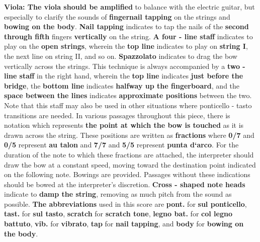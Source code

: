 \documentclass[12pt]{article}
\newcommand*\circled[1]{\tikz[baseline=(char.base)]{
            \node[shape=circle,draw,inner sep=1pt] (char) {#1};}}
\begin{document}
\begingroup
\textbf{Viola: \circled{1} The viola should be amplified} to balance with the electric guitar, but especially to clarify the sounds of \textbf{fingernail tapping} on the strings and \textbf{bowing on the body}. \textbf{\circled{2} Nail tapping} indicates to tap the nails of the \textbf{second through fifth} fingers \textbf{vertically} on the string. \textbf{\circled{3} A four - line staff} indicates to play on the \textbf{open strings}, wherein the \textbf{top line} indicates to play on \textbf{string I}, the next line on string II, and so on. \textbf{\circled{4} Spazzolato} indicates to drag the bow vertically across the strings. This technique is always accompanied by a \textbf{two - line staff} in the right hand, wherein the \textbf{top line} indicates \textbf{just before the bridge}, the \textbf{bottom line} indicates \textbf{halfway up the fingerboard}, and the \textbf{space between the lines} indicates \textbf{approximate positions} between the two. Note that this staff may also be used in other situations where ponticello - tasto transitions are needed. \textbf{\circled{5}} In various passages throughout this piece, there is notation which represents \textbf{the point at which the bow is touched} as it is drawn across the string. These positions are written as \textbf{fractions} where \textbf{0/7} and \textbf{0/5} represent \textbf{au talon} and \textbf{7/7} and \textbf{5/5} represent \textbf{punta d`arco}. For the duration of the note to which these fractions are attached, the interpreter should draw the bow at a constant speed, moving toward the destination point indicated on the following note. Bowings are provided. Passages without these indications should be bowed at the interpreter’s discretion. \textbf{\circled{6} Cross - shaped note heads} indicate to \textbf{damp the string}, removing as much pitch from the sound as possible. \textbf{\circled{7} The abbreviations} used in this score are \textbf{pont.} for \textbf{sul ponticello}, \textbf{tast.} for \textbf{sul tasto}, \textbf{scratch} for \textbf{scratch tone}, \textbf{legno bat.} for \textbf{col legno battuto}, \textbf{vib.} for \textbf{vibrato}, \textbf{tap} for \textbf{nail tapping}, and \textbf{body} for \textbf{bowing on the body}.
\endgroup

\pagebreak
\end{document}
